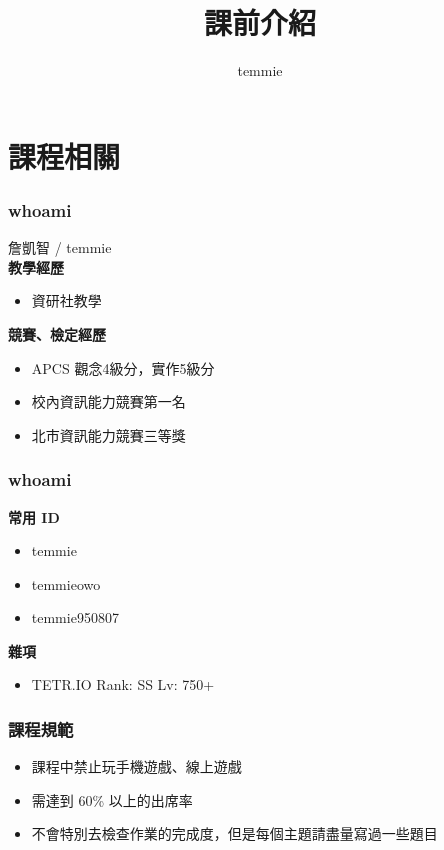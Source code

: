 \documentclass[mathserif]{beamer}
\title{課前介紹}
\author{temmie}
\date{}
\begin{document}
\begin{frame}
    \titlepage
\end{frame}

\begin{frame}
    \tableofcontents
\end{frame}

\section{課程相關}

\begin{frame}
    \frametitle{whoami}
    詹凱智 / temmie\\
    
    \vspace{0.5cm}
    \textbf{教學經歷}
    \begin{itemize}
        \item 資研社教學
    \end{itemize}
    
    \vspace{0.5cm}
    \textbf{競賽、檢定經歷}
    \begin{itemize}
        \item APCS 觀念4級分，實作5級分
        \item 校內資訊能力競賽第一名
        \item 北市資訊能力競賽三等獎
    \end{itemize}
\end{frame}

\begin{frame}
    \frametitle{whoami}
        \textbf{常用 ID}
        \begin{itemize}
            \item temmie
            \item temmieowo
            \item temmie950807
        \end{itemize}

        \vspace{0.5cm}
        \textbf{雜項}
        \begin{itemize}
            \item TETR.IO Rank: SS Lv: 750+
        \end{itemize}
\end{frame}

\begin{frame}
    \frametitle{課程規範}
    \begin{itemize}
        \item 課程中禁止玩手機遊戲、線上遊戲
        \item 需達到 60\% 以上的出席率
        \item 不會特別去檢查作業的完成度，但是每個主題請盡量寫過一些題目
    \end{itemize}
\end{frame}
\end{document}
